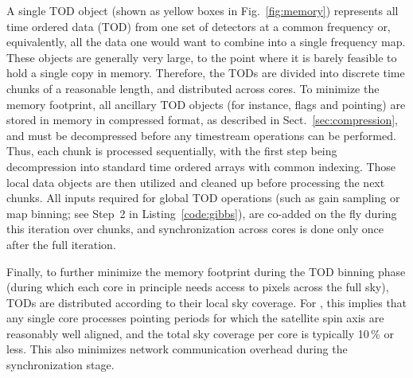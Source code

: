\documentclass[twocolumn]{aa}
\begin{document}
A single TOD object (shown as yellow boxes in Fig.~\ref{fig:memory})
represents all time ordered data (TOD) from one set of detectors at a common
frequency or, equivalently, all the data one would want to combine
into a single frequency map. These objects are generally very large,
to the point where it is barely feasible to hold a single copy in
memory. Therefore, the TODs are divided into discrete time chunks of a
reasonable length, and distributed across cores. To minimize the
memory footprint, all ancillary TOD objects (for instance, flags and
pointing) are stored in memory in compressed format, as described in
Sect.~\ref{sec:compression}, and must be decompressed before any
timestream operations can be performed. Thus, each chunk is processed
sequentially, with the first step being decompression into standard
time ordered arrays with common indexing. Those local data objects are
then utilized and cleaned up before processing the next chunks. All
inputs required for global TOD operations (such as gain sampling or
map binning; see Step~2 in Listing~\ref{code:gibbs}), are co-added on the
fly during this iteration over chunks, and synchronization across cores
is done only once after the full iteration.

Finally, to further minimize the memory footprint during the TOD
binning phase (during which each core in principle needs access to
pixels across the full sky), TODs are distributed according to their
local sky coverage. For \Planck, this implies that any single core
processes pointing periods for which the satellite spin axis are
reasonably well aligned, and the total sky coverage per core is typically
10\,\% or less. This also minimizes network communication overhead
during the synchronization stage.
\end{document}
